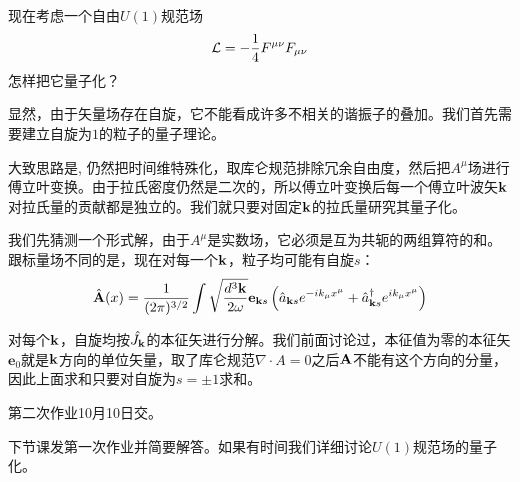 \documentclass[CJK]{beamer}
\begin{document}
\begin{frame}
\bch
现在考虑一个自由$U(1)$规范场
$${\mathcal{L}} = -\frac{1}{4}{F^{\mu\nu}}{F_{\mu\nu}}$$
怎样把它量子化？

\skipline
显然，由于矢量场存在自旋，它不能看成许多不相关的谐振子的叠加。我们首先需要建立自旋为$1$的粒子的量子理论。

大致思路是, 仍然把时间维特殊化，取库仑规范排除冗余自由度，然后把$A^\mu$场进行傅立叶变换。由于拉氏密度仍然是二次的，所以傅立叶变换后每一个傅立叶波矢${\mathbf{k}}$对拉氏量的贡献都是独立的。我们就只要对固定${\mathbf{k}}$的拉氏量研究其量子化。

\ech
\end{frame}

\begin{frame}
\bch
我们先猜测一个形式解，由于$A^\mu$是实数场，它必须是互为共轭的两组算符的和。跟标量场不同的是，现在对每一个${\mathbf{k}}$，粒子均可能有自旋$s$：
$$\hat{{\mathbf{A}}}(x) = \frac{1}{(2\pi)^{3/2}} \int \sqrt{\frac{d^3{\mathbf{k}}}{2\omega}} \mathbf{e}_{{\mathbf{k}} s}\left({\hat{a}}_{{\mathbf{k}} s} e^{-ik_\mu x^\mu} + {\hat{a}^\dagger}_{{\mathbf{k}} s}e^{ik_\mu x^\mu}\right) $$

对每个${\mathbf{k}}$，自旋均按$\hat{J_{\mathbf{k}}}$的本征矢进行分解。我们前面讨论过，本征值为零的本征矢$\mathbf{e}_0$就是${\mathbf{k}}$方向的单位矢量，取了库仑规范$\nabla\cdot A=0$之后${\mathbf{A}}$不能有这个方向的分量，因此上面求和只要对自旋为$s=\pm 1$求和。
\ech
\end{frame}

\begin{frame}
\bch
第二次作业10月10日交。

\skipline
下节课发第一次作业并简要解答。如果有时间我们详细讨论$U(1)$规范场的量子化。
\ech
\end{frame}
\end{document}
